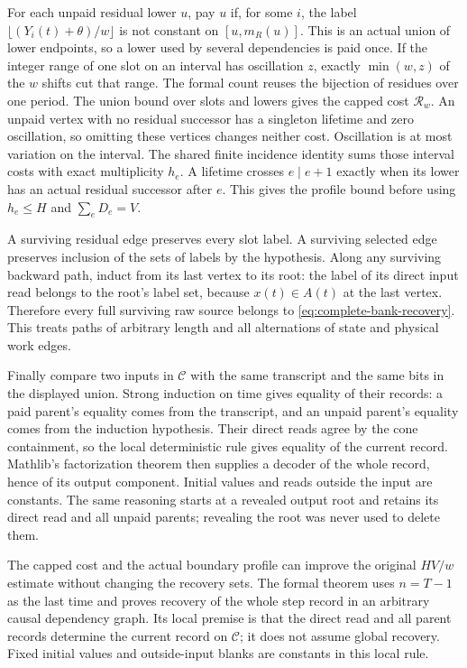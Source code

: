 \begin{outline}
For each unpaid residual lower $u$, pay $u$ if, for some $i$, the label
$\lfloor(Y_i(t)+\theta)/w\rfloor$ is not constant on
$[u,m_R(u)]$. This is an actual union of lower endpoints, so a lower
used by several dependencies is paid once. If the integer range of one
slot on an interval has oscillation $z$, exactly $\min(w,z)$ of the
$w$ shifts cut that range. The formal count reuses the bijection of
residues over one period. The union bound over slots and lowers gives
the capped cost $\mathcal R_w$. An unpaid vertex with no residual
successor has a singleton lifetime and zero oscillation, so omitting
these vertices changes neither cost.
Oscillation is at most variation on the interval. The shared finite
incidence identity sums those interval costs with exact multiplicity
$h_e$. A lifetime crosses $e\mid e+1$ exactly when its lower has an
actual residual successor after $e$. This gives the profile bound before
using $h_e\le H$ and $\sum_eD_e=V$.

A surviving residual edge preserves every slot label. A surviving
selected edge preserves inclusion of the sets of labels by the
hypothesis. Along any surviving backward path, induct from its last
vertex to its root: the label of its direct input read belongs to the
root's label set, because $x(t)\in A(t)$ at the last vertex. Therefore
every full surviving raw source belongs to
\eqref{eq:complete-bank-recovery}. This treats paths of arbitrary
length and all alternations of state and physical work edges.

Finally compare two inputs in $\mathcal C$ with the same transcript and
the same bits in the displayed union. Strong induction on time gives
equality of their records: a paid parent's equality comes from the
transcript, and an unpaid parent's equality comes from the induction
hypothesis. Their direct reads agree by the cone containment, so the
local deterministic rule gives equality of the current record.
Mathlib's factorization theorem then supplies a decoder of the whole
record, hence of its output component. Initial values and reads outside
the input are constants. The same reasoning starts at a revealed output
root and retains its direct read and all unpaid parents; revealing the
root was never used to delete them.
\end{outline}

The capped cost and the actual boundary profile can improve the original
$HV/w$ estimate without changing the recovery sets. The formal theorem
uses $n=T-1$ as the last time and proves recovery of the whole step
record in an arbitrary causal dependency graph. Its local premise is
that the direct read and all parent records determine the current record
on $\mathcal C$; it does not assume global recovery. Fixed initial values
and outside-input blanks are constants in this local rule.

